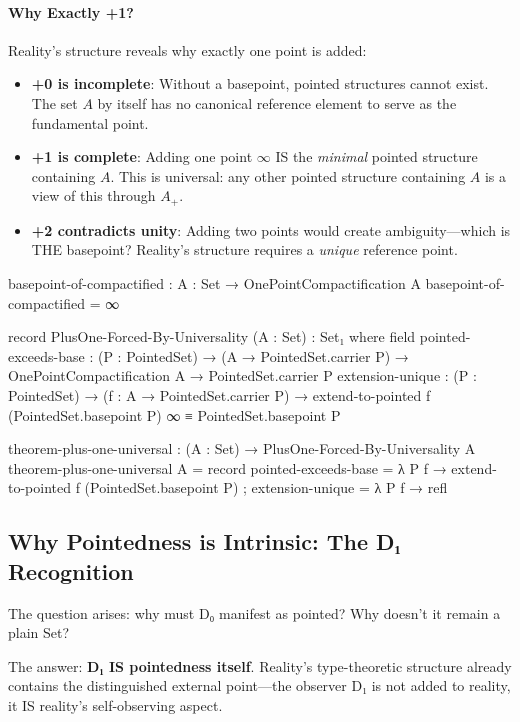 \documentclass[11pt,a4paper]{book}
\begin{document}
\paragraph{Why Exactly +1?}
Reality's structure reveals why exactly one point is added:
\begin{itemize}
\item \textbf{+0 is incomplete}: Without a basepoint, pointed structures cannot exist. The set 
$A$ by itself has no canonical reference element to serve as the fundamental point.
\item \textbf{+1 is complete}: Adding one point $\infty$ IS the \emph{minimal} pointed structure 
containing $A$. This is universal: any other pointed structure containing $A$ is a view of this through $A_+$.
\item \textbf{+2 contradicts unity}: Adding two points would create ambiguity—which is THE 
basepoint? Reality's structure requires a \emph{unique} reference point.
\end{itemize}

\begin{code}
basepoint-of-compactified : {A : Set} → OnePointCompactification A
basepoint-of-compactified = ∞

record PlusOne-Forced-By-Universality (A : Set) : Set₁ where
  field
    pointed-exceeds-base : (P : PointedSet) → (A → PointedSet.carrier P) 
                         → OnePointCompactification A → PointedSet.carrier P
    extension-unique : (P : PointedSet) → (f : A → PointedSet.carrier P) 
                     → extend-to-pointed f (PointedSet.basepoint P) ∞ ≡ PointedSet.basepoint P

theorem-plus-one-universal : (A : Set) → PlusOne-Forced-By-Universality A
theorem-plus-one-universal A = record
  { pointed-exceeds-base = λ P f → extend-to-pointed f (PointedSet.basepoint P)
  ; extension-unique = λ P f → refl
  }
\end{code}

\subsection{Why Pointedness is Intrinsic: The D₁ Recognition}

The question arises: why must D₀ manifest as pointed? Why doesn't it remain a plain Set?

The answer: \textbf{D₁ IS pointedness itself}. Reality's type-theoretic structure 
already contains the distinguished external point—the observer D₁ is not added to 
reality, it IS reality's self-observing aspect.
\end{document}
